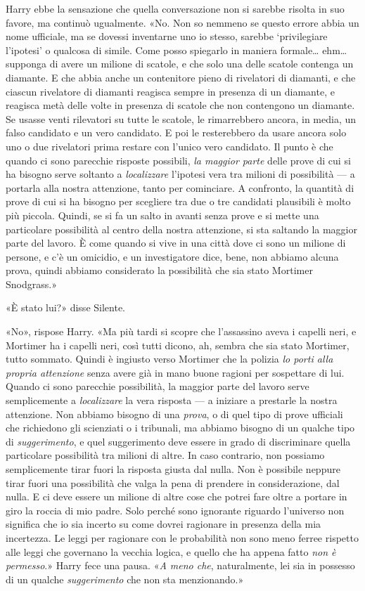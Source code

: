 Harry ebbe la sensazione che quella conversazione non si sarebbe risolta in suo favore, ma continuò ugualmente. «No. Non so nemmeno se questo errore abbia un nome ufficiale, ma se dovessi inventarne uno io stesso, sarebbe ‘privilegiare l’ipotesi’ o qualcosa di simile. Come posso spiegarlo in maniera formale… ehm… supponga di avere un milione di scatole, e che solo una delle scatole contenga un diamante. E che abbia anche un contenitore pieno di rivelatori di diamanti, e che ciascun rivelatore di diamanti reagisca sempre in presenza di un diamante, e reagisca metà delle volte in presenza di scatole che non contengono un diamante. Se usasse venti rilevatori su tutte le scatole, le rimarrebbero ancora, in media, un falso candidato e un vero candidato. E poi le resterebbero da usare ancora solo uno o due rivelatori prima restare con l’unico vero candidato. Il punto è che quando ci sono parecchie risposte possibili, \textit{la maggior parte} delle prove di cui si ha bisogno serve soltanto a \textit{localizzare} l’ipotesi vera tra milioni di possibilità — a portarla alla nostra attenzione, tanto per cominciare. A confronto, la quantità di prove di cui si ha bisogno per scegliere tra due o tre candidati plausibili è molto più piccola. Quindi, se si fa un salto in avanti senza prove e si mette una particolare possibilità al centro della nostra attenzione, si sta saltando la maggior parte del lavoro. È come quando si vive in una città dove ci sono un milione di persone, e c’è un omicidio, e un investigatore dice, bene, non abbiamo alcuna prova, quindi abbiamo considerato la possibilità che sia stato Mortimer Snodgrass.»

«È stato lui?» disse Silente.

«No», rispose Harry. «Ma più tardi si scopre che l’assassino aveva i capelli neri, e Mortimer ha i capelli neri, così tutti dicono, ah, sembra che sia stato Mortimer, tutto sommato. Quindi è ingiusto verso Mortimer che la polizia \textit{lo porti alla propria attenzione} senza avere già in mano buone ragioni per sospettare di lui. Quando ci sono parecchie possibilità, la maggior parte del lavoro serve semplicemente a \textit{localizzare} la vera risposta — a iniziare a prestarle la nostra attenzione. Non abbiamo bisogno di una \textit{prova}, o di quel tipo di prove ufficiali che richiedono gli scienziati o i tribunali, ma abbiamo bisogno di un qualche tipo di \textit{suggerimento}, e quel suggerimento deve essere in grado di discriminare quella particolare possibilità tra milioni di altre. In caso contrario, non possiamo semplicemente tirar fuori la risposta giusta dal nulla. Non è possibile neppure tirar fuori una possibilità che valga la pena di prendere in considerazione, dal nulla. E ci deve essere un milione di altre cose che potrei fare oltre a portare in giro la roccia di mio padre. Solo perché sono ignorante riguardo l’universo non significa che io sia incerto su come dovrei ragionare in presenza della mia incertezza. Le leggi per ragionare con le probabilità non sono meno ferree rispetto alle leggi che governano la vecchia logica, e quello che ha appena fatto \textit{non è permesso}.» Harry fece una pausa. «\textit{A meno che}, naturalmente, lei sia in possesso di un qualche \textit{suggerimento} che non sta menzionando.»

